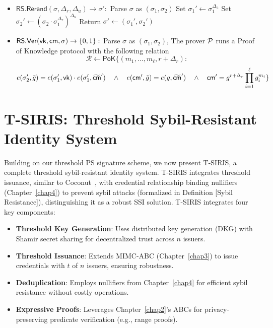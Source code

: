 \begin{itemize}
    \item $\mathsf{RS.Rerand}(\sigma, \Delta_r, \Delta_u) \to \sigma':$
        Parse $\sigma$ as $(\sigma_1, \sigma_2)$
        Set $\sigma_1' \gets \sigma_1^{\Delta_u}$
        Set $\sigma_2' \gets (\sigma_2 \cdot \sigma_1^{\Delta_r})^{\Delta_u}$
        Return $\sigma' \gets (\sigma_1', \sigma_2')$
    
    \item $\mathsf{RS.Ver}(\mathsf{vk}, \mathsf{cm}, \sigma) \to \{0,1\}:$
        Parse $\sigma$ as $(\sigma_1, \sigma_2)$, The prover $\mathcal{P}$ runs a Proof of Knowledge protocol with the following relation 
    \[
        \mathcal{R} \gets \mathsf{PoK}\{(m_1,\ldots,m_\ell, r + \Delta_r): 
    \]
    \[
         e(\sigma_2', \tilde{g}) = e(\sigma_1', \mathsf{vk})\cdot e(\sigma_1', \widetilde{\mathsf{cm}}') \quad \wedge \quad
        e(\mathsf{cm}', \tilde{g}) = e(g, \widetilde{\mathsf{cm}}') \quad \wedge \quad
        \mathsf{cm}' = g^{r + \Delta_r} \prod_{i=1}^\ell g_i^{m_i}
        \}
    \]

\end{itemize}





\section{T-SIRIS: Threshold Sybil-Resistant Identity System}
\label{sec:tsiris}
Building on our threshold PS signature scheme, we now present T-SIRIS, a complete threshold sybil-resistant identity system. T-SIRIS integrates threshold issuance, similar to Coconut~\cite{sonnino_coconut_2020}, with credential relationship binding nullifiers (Chapter~\ref{chap4}) to prevent sybil attacks (formalized in Definition [Sybil Resistance]), distinguishing it as a robust SSI solution. T-SIRIS integrates four key components:
\begin{itemize}
    \item \textbf{Threshold Key Generation}: Uses distributed key generation (DKG) with Shamir secret sharing for decentralized trust across $n$ issuers.
    \item \textbf{Threshold Issuance}: Extends MIMC-ABC (Chapter~\ref{chap3}) to issue credentials with $t$ of $n$ issuers, ensuring robustness.
    \item \textbf{Deduplication}: Employs nullifiers from Chapter~\ref{chap4} for efficient sybil resistance without costly operations.
    \item \textbf{Expressive Proofs}: Leverages Chapter~\ref{chap2}'s ABCs for privacy-preserving predicate verification (e.g., range proofs).
\end{itemize}


